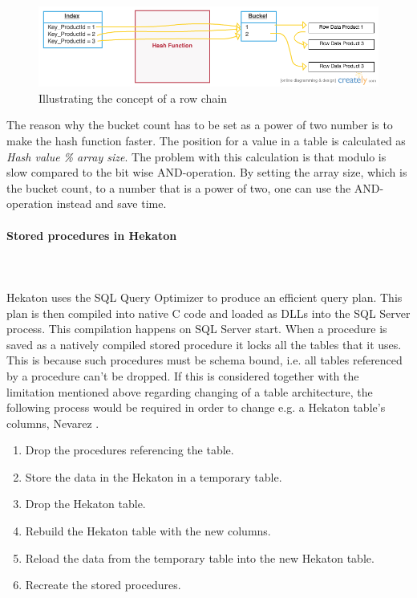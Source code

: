 \documentclass{cslthse-msc}
\begin{document}
\begin{figure}[H]
\begin{center}
\includegraphics[scale=0.5]{Pictures/buckets2.png}
\caption{Illustrating the concept of a row chain}
\end{center}
\end{figure}

\noindent The reason why the bucket count has to be set as a power of two number is to make the hash function faster. The position for a value in a table is calculated as \emph{Hash value \% array size}. The problem with this calculation is that modulo is slow compared to the bit wise AND-operation. By setting the array size, which is the bucket count, to a number that is a power of two, one can use the AND-operation instead and save time.

\paragraph*{Stored procedures in Hekaton}\mbox{}\\\\ 
Hekaton uses the SQL Query Optimizer to produce an efficient query plan. This plan is then compiled into native C code and loaded as DLLs into the SQL Server process. This compilation happens on SQL Server start.
When a procedure is saved as a natively compiled stored procedure it locks all the tables that it uses. This is because such procedures must be schema bound, i.e. all tables referenced by a procedure can't be dropped. If this is considered together with the limitation mentioned above regarding changing of a table architecture, the following process would be required in order to change e.g. a Hekaton table's columns, Nevarez \cite{Nevarez}.
\begin{enumerate}
\item Drop the procedures referencing the table.
\item Store the data in the Hekaton in a temporary table.
\item Drop the Hekaton table.
\item Rebuild the Hekaton table with the new columns.
\item Reload the data from the temporary table into the new Hekaton table. 
\item Recreate the stored procedures.
\end{enumerate}
\end{document}

